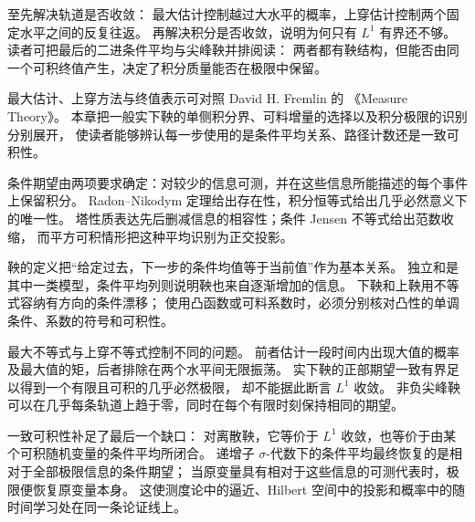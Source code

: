 \ProseParagraphBreak

至先解决轨道是否收敛：
最大估计控制越过大水平的概率，上穿估计控制两个固定水平之间的反复往返。
再解决积分是否收敛，说明为何只有 \(L^1\) 有界还不够。
读者可把最后的二进条件平均与尖峰鞅并排阅读：
两者都有鞅结构，但能否由同一个可积终值产生，决定了积分质量能否在极限中保留。

\ProseParagraphBreak

最大估计、上穿方法与终值表示可对照 David H. Fremlin 的
《Measure Theory》\cite[275D--275I]{Fremlin2016Measure}。
本章把一般实下鞅的单侧积分界、可料增量的选择以及积分极限的识别分别展开，
使读者能够辨认每一步使用的是条件平均关系、路径计数还是一致可积性。








\begin{chaptersummary}
条件期望由两项要求确定：对较少的信息可测，并在这些信息所能描述的每个事件上保留积分。
Radon--Nikodym 定理给出存在性，积分恒等式给出几乎必然意义下的唯一性。
塔性质表达先后删减信息的相容性；条件 Jensen 不等式给出范数收缩，
而平方可积情形把这种平均识别为正交投影。

\ProseParagraphBreak

鞅的定义把“给定过去，下一步的条件均值等于当前值”作为基本关系。
独立和是其中一类模型，条件平均列则说明鞅也来自逐渐增加的信息。
下鞅和上鞅用不等式容纳有方向的条件漂移；
使用凸函数或可料系数时，必须分别核对凸性的单调条件、系数的符号和可积性。

\ProseParagraphBreak

最大不等式与上穿不等式控制不同的问题。
前者估计一段时间内出现大值的概率及最大值的矩，后者排除在两个水平间无限振荡。
实下鞅的正部期望一致有界足以得到一个有限且可积的几乎必然极限，
却不能据此断言 \(L^1\) 收敛。
非负尖峰鞅可以在几乎每条轨道上趋于零，同时在每个有限时刻保持相同的期望。

\ProseParagraphBreak

一致可积性补足了最后一个缺口：
对离散鞅，它等价于 \(L^1\) 收敛，也等价于由某个可积随机变量的条件平均所闭合。
递增子 \(\sigma\)-代数下的条件平均最终恢复的是相对于全部极限信息的条件期望；
当原变量具有相对于这些信息的可测代表时，极限便恢复原变量本身。
这使测度论中的逼近、Hilbert 空间中的投影和概率中的随时间学习处在同一条论证线上。
\end{chaptersummary}


